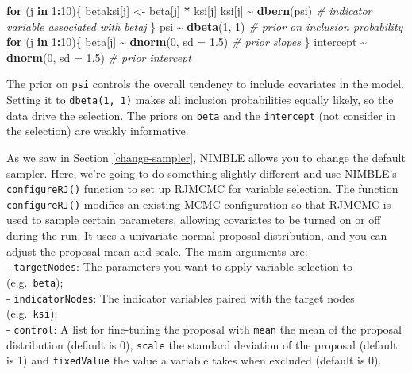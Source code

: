 \documentclass[
  12pt,
]{krantz}
\newenvironment{Shaded}{\begin{snugshade}}{\end{snugshade}}
\newcommand{\AttributeTok}[1]{\textcolor[rgb]{0.13,0.29,0.53}{#1}}
\newcommand{\CommentTok}[1]{\textcolor[rgb]{0.56,0.35,0.01}{\textit{#1}}}
\newcommand{\ControlFlowTok}[1]{\textcolor[rgb]{0.13,0.29,0.53}{\textbf{#1}}}
\newcommand{\DecValTok}[1]{\textcolor[rgb]{0.00,0.00,0.81}{#1}}
\newcommand{\FloatTok}[1]{\textcolor[rgb]{0.00,0.00,0.81}{#1}}
\newcommand{\FunctionTok}[1]{\textcolor[rgb]{0.13,0.29,0.53}{\textbf{#1}}}
\newcommand{\NormalTok}[1]{#1}
\newcommand{\OtherTok}[1]{\textcolor[rgb]{0.56,0.35,0.01}{#1}}
\newcommand{\SpecialCharTok}[1]{\textcolor[rgb]{0.81,0.36,0.00}{\textbf{#1}}}
\begin{document}
\begin{Shaded}
\begin{Highlighting}[]
\ControlFlowTok{for}\NormalTok{ (j }\ControlFlowTok{in} \DecValTok{1}\SpecialCharTok{:}\DecValTok{10}\NormalTok{)\{}
\NormalTok{  betaksi[j] }\OtherTok{\textless{}{-}}\NormalTok{ beta[j] }\SpecialCharTok{*}\NormalTok{ ksi[j]}
\NormalTok{  ksi[j] }\SpecialCharTok{\textasciitilde{}} \FunctionTok{dbern}\NormalTok{(psi) }\CommentTok{\# indicator variable associated with betaj}
\NormalTok{\}}
\NormalTok{psi }\SpecialCharTok{\textasciitilde{}} \FunctionTok{dbeta}\NormalTok{(}\DecValTok{1}\NormalTok{, }\DecValTok{1}\NormalTok{) }\CommentTok{\# prior on inclusion probability}
\ControlFlowTok{for}\NormalTok{ (j }\ControlFlowTok{in} \DecValTok{1}\SpecialCharTok{:}\DecValTok{10}\NormalTok{)\{}
\NormalTok{  beta[j] }\SpecialCharTok{\textasciitilde{}} \FunctionTok{dnorm}\NormalTok{(}\DecValTok{0}\NormalTok{, }\AttributeTok{sd =} \FloatTok{1.5}\NormalTok{) }\CommentTok{\# prior slopes}
\NormalTok{\}}
\NormalTok{intercept }\SpecialCharTok{\textasciitilde{}} \FunctionTok{dnorm}\NormalTok{(}\DecValTok{0}\NormalTok{, }\AttributeTok{sd =} \FloatTok{1.5}\NormalTok{) }\CommentTok{\# prior intercept}
\end{Highlighting}
\end{Shaded}

The prior on \texttt{psi} controls the overall tendency to include covariates in the model. Setting it to \texttt{dbeta(1,\ 1)} makes all inclusion probabilities equally likely, so the data drive the selection. The priors on \texttt{beta} and the \texttt{intercept} (not consider in the selection) are weakly informative.

As we saw in Section \ref{change-sampler}, NIMBLE allows you to change the default sampler. Here, we're going to do something slightly different and use NIMBLE's \texttt{configureRJ()} function to set up RJMCMC for variable selection. The function \texttt{configureRJ()} modifies an existing MCMC configuration so that RJMCMC is used to sample certain parameters, allowing covariates to be turned on or off during the run. It uses a univariate normal proposal distribution, and you can adjust the proposal mean and scale. The main arguments are:\\
- \texttt{targetNodes}: The parameters you want to apply variable selection to (e.g.~\texttt{beta});\\
- \texttt{indicatorNodes}: The indicator variables paired with the target nodes (e.g.~\texttt{ksi});\\
- \texttt{control}: A list for fine-tuning the proposal with \texttt{mean} the mean of the proposal distribution (default is 0), \texttt{scale} the standard deviation of the proposal (default is 1) and \texttt{fixedValue} the value a variable takes when excluded (default is 0).
\end{document}
